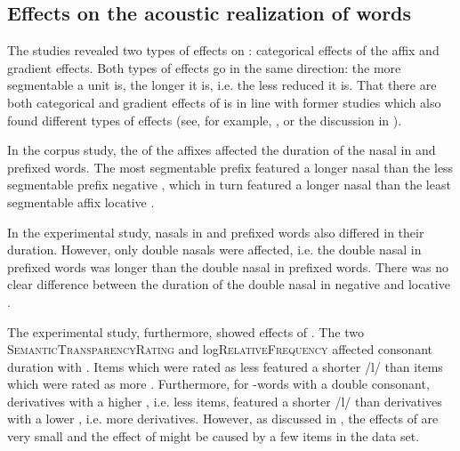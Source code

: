 \subsection{Effects on the acoustic realization of words}

The studies revealed two types of  effects on : categorical  effects of the affix and gradient  effects. Both types of effects go in the same direction: the more segmentable a unit is, the  longer it is, i.e. the less reduced it is. That there are both categorical and gradient effects of  is in line with former studies which also found different types of  effects (see, for example, \cite{Schuppler.2012}, or the discussion in ). 

In the corpus study, the  of the affixes affected the duration of the nasal in  and prefixed words. The most segmentable prefix  featured a longer nasal than the less segmentable prefix negative , which in turn featured a longer nasal than the least segmentable affix locative . 


In the experimental study, nasals in  and prefixed words also differed in their duration. However, only double nasals were affected, i.e. the double nasal in prefixed words was longer than the double nasal in prefixed words. There was no clear difference between the duration of the double nasal in negative and locative .

The experimental study, furthermore, showed effects of . The two  \textsc{SemanticTransparencyRating} and log\textsc{RelativeFrequency} affected consonant duration with . Items which were rated as less  featured a shorter /l/ than items which were rated as more . Furthermore, for -words with a  double consonant, derivatives with a higher , i.e. less  items, featured a shorter /l/ than derivatives with a lower , i.e. more  derivatives. However, as discussed in , the effects of  are very small and the effect of  might be caused by a few items in the data set. 


